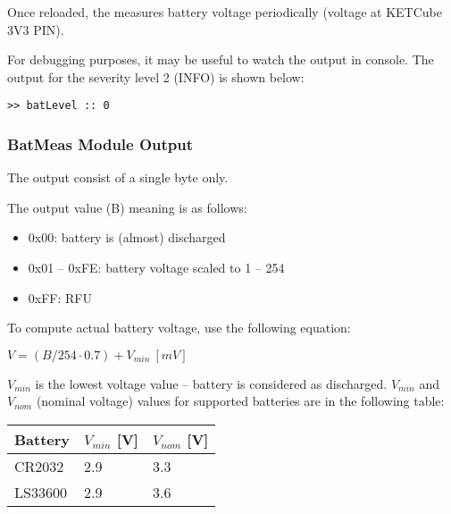   Once reloaded, the  measures battery voltage periodically (voltage at KETCube 3V3 PIN). 
  
For debugging purposes, it may be useful to watch the  output in console. The output for the severity level 2 (INFO) is shown below:

\begin{docCodeExample}
\begin{verbatim}
>> batLevel :: 0
\end{verbatim}
\end{docCodeExample}

\subsubsection{BatMeas Module Output}
  The  output consist of a single byte only.
  
  The  output value (B) meaning is as follows:
  
  \begin{itemize}
    \item 0x00: battery is (almost) discharged
    \item 0x01 -- 0xFE: battery voltage scaled to 1 -- 254
    \item 0xFF: RFU
  \end{itemize}
  
  To compute actual battery voltage, use the following equation:
  
  $V = (B/254 \cdot 0.7) + V_{min} ~[mV]$
  
  $V_{min}$ is the lowest voltage value -- battery is considered as discharged. $V_{min}$ and $V_{nom}$ (nominal voltage) values for supported batteries are in the following table:
  
  \begin{table*}[!ht]
    \begin{tabular}{| p{3.5cm} | p{2cm} | p{2cm} |}
        \hline
        \rowcolor{SeaGreen3!30!} {\bf Battery} & $V_{min}$ [V] & $V_{nom}$ [V] \\
        \hline
        \hline
        CR2032 & 2.9 & 3.3 \\
        \hline
        LS33600 & 2.9 & 3.6 \\
        \hline
    \end{tabular}
    \label{tab:spec:AMR}
   \end{table*}
  
